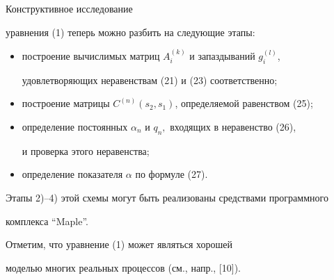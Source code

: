 \begin{note}


Конструктивное исследование


уравнения (1)  теперь можно разбить на следующие этапы:


\begin{itemize}


\item[1)] построение вычислимых матриц $A_i^{(k)}$ и запаздываний $g_i^{(l)}$,


удовлетворяющих неравенствам (21) и (23) соответственно;


\item[2)] построение матрицы $C^{(n)}(s_2,s_1)$, определяемой равенством (25);


\item[3)] определение постоянных $\alpha_n$ и $q_n,$ входящих в неравенство (26),


и проверка этого неравенства;


\item[4)] определение показателя $\alpha$ по формуле (27).


\end{itemize}





Этапы 2)--4) этой схемы могут быть реализованы средствами программного


комплекса ``Maple''.


\end{note}





\begin{note}


Отметим, что уравнение  (1) может являться хорошей


моделью многих реальных процессов (см., напр., [10]).


\end{note}









